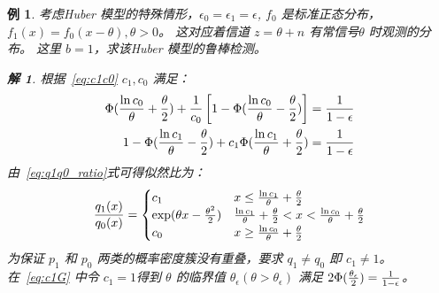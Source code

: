 \documentclass{ctexart}
\numberwithin{equation}{section}
\newtheorem{example}{例}
\newtheorem*{solution}{解}
\begin{document}
\begin{example}
考虑Huber 模型的特殊情形，$ \epsilon_0 = \epsilon_1 = \epsilon $, $f_0$ 是标准正态分布， $f_1(x) = f_0( x - \theta),
\theta > 0 $。 这对应着信道 $ z = \theta + n $ 有常信号$\theta$ 时观测的分布。 这里 $ b = 1 $，求该Huber 模型的鲁棒检测。
\begin{solution}
根据~\eqref{eq:c1c0}
 $ c_1, c_0$ 满足：
 \begin{align}\label{eq:c1G}
 \Phi({\ln c_0 \over \theta} + { \theta \over 2}) + {1 \over c_0} \left[ 1 - \Phi({\ln c_0 \over \theta} - { \theta \over 2})\right] & =
 {1 \over 1 - \epsilon} \\
 1 - \Phi({\ln c_1 \over \theta} - { \theta \over 2}) + c_1 \Phi({\ln c_1 \over \theta} + { \theta \over 2}) & =
 {1 \over 1 - \epsilon} \nonumber
\end{align}
由~\eqref{eq:q1q0_ratio}式可得似然比为：
$$
{ q_1(x) \over q_0(x) } = \begin{cases}
c_1 &  x \leq {\ln c_1 \over \theta} + { \theta \over 2} \\
\exp(\theta x - {\theta^2 \over 2})& {\ln c_1 \over \theta} + { \theta \over 2} < x < {\ln c_0 \over \theta} + { \theta \over 2} \\
 c_0 &  x \geq {\ln c_0 \over \theta} + { \theta \over 2}
 \end{cases}
$$
为保证 $ p_1 $ 和  $ p_0 $ 两类的概率密度簇没有重叠，要求 $ q_1 \neq q_0$ 即 $ c_1 \neq 1 $。在~\eqref{eq:c1G} 中令
$ c_1 = 1$得到 $ \theta $ 的临界值 $ \theta_{\epsilon} (\theta > \theta_{\epsilon})$ 满足 $ 2 \Phi({ \theta_{\epsilon} \over 2 }) = { 1 \over 1 - \epsilon} $。
\end{solution}
\end{example}
\end{document}
